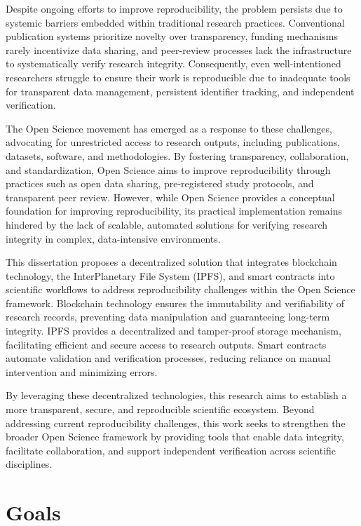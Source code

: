\documentclass[final]{rc-book-2.14}
\begin{document}
Despite ongoing efforts to improve reproducibility, the problem persists due to systemic barriers embedded within traditional research practices. Conventional publication systems prioritize novelty over transparency, funding mechanisms rarely incentivize data sharing, and peer-review processes lack the infrastructure to systematically verify research integrity. Consequently, even well-intentioned researchers struggle to ensure their work is reproducible due to inadequate tools for transparent data management, persistent identifier tracking, and independent verification.

The Open Science movement has emerged as a response to these challenges, advocating for unrestricted access to research outputs, including publications, datasets, software, and methodologies. By fostering transparency, collaboration, and standardization, Open Science aims to improve reproducibility through practices such as open data sharing, pre-registered study protocols, and transparent peer review. However, while Open Science provides a conceptual foundation for improving reproducibility, its practical implementation remains hindered by the lack of scalable, automated solutions for verifying research integrity in complex, data-intensive environments.

This dissertation proposes a decentralized solution that integrates blockchain technology, the InterPlanetary File System (IPFS), and smart contracts into scientific workflows to address reproducibility challenges within the Open Science framework. Blockchain technology ensures the immutability and verifiability of research records, preventing data manipulation and guaranteeing long-term integrity. IPFS provides a decentralized and tamper-proof storage mechanism, facilitating efficient and secure access to research outputs. Smart contracts automate validation and verification processes, reducing reliance on manual intervention and minimizing errors.

By leveraging these decentralized technologies, this research aims to establish a more transparent, secure, and reproducible scientific ecosystem. Beyond addressing current reproducibility challenges, this work seeks to strengthen the broader Open Science framework by providing tools that enable data integrity, facilitate collaboration, and support independent verification across scientific disciplines.


\section{Goals}
\label{sec:introduction:goal}
\end{document}
